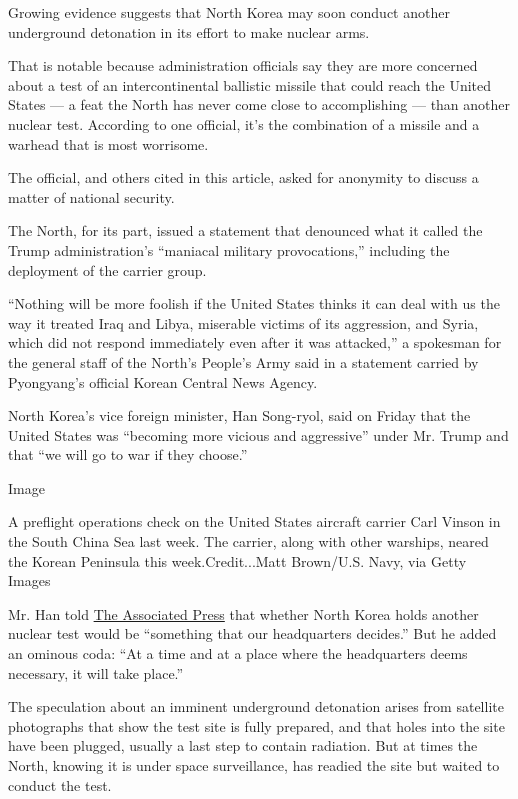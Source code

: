 Growing evidence suggests that North Korea may soon conduct another
underground detonation in its effort to make nuclear arms.

That is notable because administration officials say they are more
concerned about a test of an intercontinental ballistic missile that
could reach the United States --- a feat the North has never come close
to accomplishing --- than another nuclear test. According to one
official, it's the combination of a missile and a warhead that is most
worrisome.

The official, and others cited in this article, asked for anonymity to
discuss a matter of national security.

The North, for its part, issued a statement that denounced what it
called the Trump administration's ``maniacal military provocations,''
including the deployment of the carrier group.

``Nothing will be more foolish if the United States thinks it can deal
with us the way it treated Iraq and Libya, miserable victims of its
aggression, and Syria, which did not respond immediately even after it
was attacked,'' a spokesman for the general staff of the North's
People's Army said in a statement carried by Pyongyang's official Korean
Central News Agency.

North Korea's vice foreign minister, Han Song-ryol, said on Friday that
the United States was ``becoming more vicious and aggressive'' under Mr.
Trump and that ``we will go to war if they choose.''

Image

A preflight operations check on the United States aircraft carrier Carl
Vinson in the South China Sea last week. The carrier, along with other
warships, neared the Korean Peninsula this week.Credit...Matt Brown/U.S.
Navy, via Getty Images

Mr. Han told
\href{http://bigstory.ap.org/article/7db133ff3bf94648be84d48a1babf4e3/n-korean-official-us-more-vicious-aggressive-under-trump}{The
Associated Press} that whether North Korea holds another nuclear test
would be ``something that our headquarters decides.'' But he added an
ominous coda: ``At a time and at a place where the headquarters deems
necessary, it will take place.''

The speculation about an imminent underground detonation arises from
satellite photographs that show the test site is fully prepared, and
that holes into the site have been plugged, usually a last step to
contain radiation. But at times the North, knowing it is under space
surveillance, has readied the site but waited to conduct the test.


